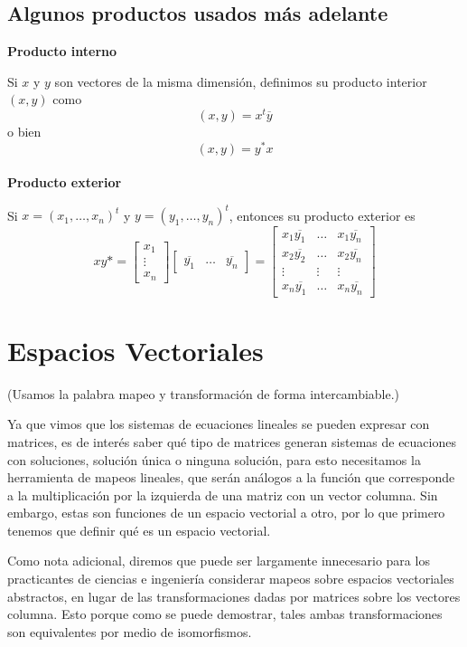 \documentclass{article}
\begin{document}
\subsection{Algunos productos usados más adelante}
\textbf{Producto interno}

Si $x$ y $y$ son vectores de la misma dimensión, definimos su
producto interior $(x,y)$ como
\[(x,y) = x^t \overline y\]
o bien
\[(x,y) = y^* x\]
\\
\textbf{Producto exterior}

Si $x=(x_1,\ldots,x_n)^t$ y $y=(y_1,\ldots, y_n)^t$, entonces
su producto exterior es
$$x y* =
\begin{bmatrix} x_1 \\ \vdots \\ x_n \end{bmatrix}
\begin{bmatrix}
    \overline{y_1} & \ldots & \overline{y_n}
\end{bmatrix} =
\begin{bmatrix}
    x_1 \overline {y_1} & \ldots & x_1 \overline {y_n} \\
    x_2 \overline{y_2} & \ldots & x_2 \overline{y_n} \\
    \vdots & \vdots & \vdots \\
    x_n \overline{y_1} & \ldots & x_n \overline{y_n}
\end{bmatrix}
$$
\newpage

\section{Espacios Vectoriales}
(Usamos la palabra mapeo y transformación de forma intercambiable.)

Ya que vimos que los sistemas de ecuaciones lineales se pueden expresar con matrices, es de interés saber qué tipo de matrices generan sistemas de ecuaciones con soluciones, solución única o ninguna solución, para esto necesitamos la herramienta de mapeos lineales, que serán análogos a la función que corresponde a la multiplicación por la izquierda de una matriz con un vector columna. Sin embargo, estas son funciones de un espacio vectorial a otro, por lo que primero tenemos que definir qué es un espacio vectorial.

Como nota adicional, diremos que puede ser largamente innecesario para los practicantes de ciencias e ingeniería considerar mapeos sobre espacios vectoriales abstractos, en lugar de las transformaciones dadas por matrices sobre los vectores columna. Esto porque como se puede demostrar, tales ambas transformaciones son equivalentes por medio de isomorfismos.
\end{document}
